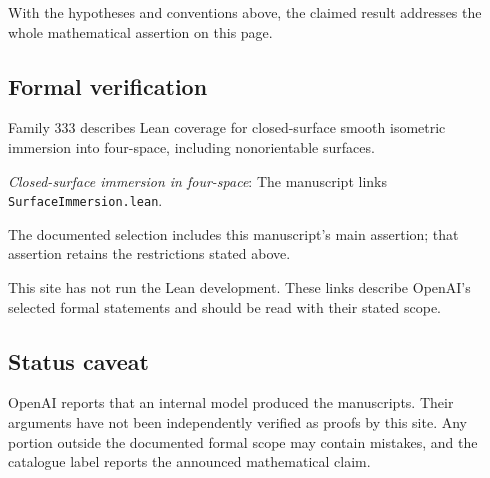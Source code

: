 \documentclass[11pt]{article}
\begin{document}
With the hypotheses and conventions above, the claimed result addresses the whole mathematical assertion on this page.

\subsection{Formal verification}
Family 333 describes Lean coverage for closed-surface smooth isometric immersion into four-space, including nonorientable surfaces.

\textit{Closed-surface immersion in four-space}: The manuscript links \texttt{SurfaceImmersion.lean}.

The documented selection includes this manuscript’s main assertion; that assertion retains the restrictions stated above.

This site has not run the Lean development. These links describe OpenAI’s selected formal statements and should be read with their stated scope.

\subsection{Status caveat}
OpenAI reports that an internal model produced the manuscripts. Their arguments have not been independently verified as proofs by this site. Any portion outside the documented formal scope may contain mistakes, and the catalogue label reports the announced mathematical claim.
\end{document}
